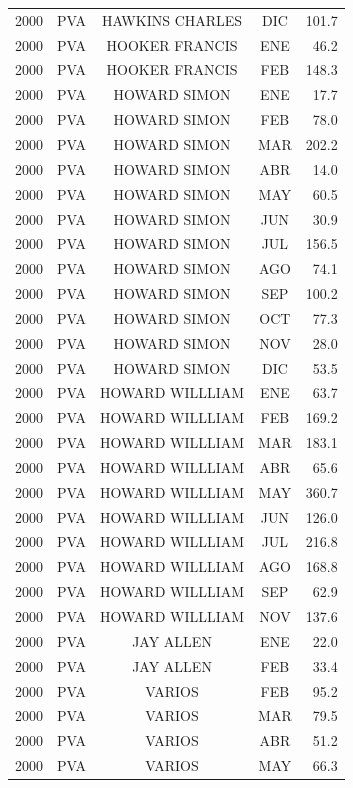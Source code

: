 \documentclass[12pt,]{article}
\begin{document}
\begin{table}[ht]
{\begin{tabular}{lcccr}
  2000 & PVA & HAWKINS CHARLES & DIC & 101.7 \\ 
  2000 & PVA & HOOKER FRANCIS & ENE & 46.2 \\ 
  2000 & PVA & HOOKER FRANCIS & FEB & 148.3 \\ 
  2000 & PVA & HOWARD SIMON & ENE & 17.7 \\ 
  2000 & PVA & HOWARD SIMON & FEB & 78.0 \\ 
  2000 & PVA & HOWARD SIMON & MAR & 202.2 \\ 
  2000 & PVA & HOWARD SIMON & ABR & 14.0 \\ 
  2000 & PVA & HOWARD SIMON & MAY & 60.5 \\ 
  2000 & PVA & HOWARD SIMON & JUN & 30.9 \\ 
  2000 & PVA & HOWARD SIMON & JUL & 156.5 \\ 
  2000 & PVA & HOWARD SIMON & AGO & 74.1 \\ 
  2000 & PVA & HOWARD SIMON & SEP & 100.2 \\ 
  2000 & PVA & HOWARD SIMON & OCT & 77.3 \\ 
  2000 & PVA & HOWARD SIMON & NOV & 28.0 \\ 
  2000 & PVA & HOWARD SIMON & DIC & 53.5 \\ 
  2000 & PVA & HOWARD WILLLIAM & ENE & 63.7 \\ 
  2000 & PVA & HOWARD WILLLIAM & FEB & 169.2 \\ 
  2000 & PVA & HOWARD WILLLIAM & MAR & 183.1 \\ 
  2000 & PVA & HOWARD WILLLIAM & ABR & 65.6 \\ 
  2000 & PVA & HOWARD WILLLIAM & MAY & 360.7 \\ 
  2000 & PVA & HOWARD WILLLIAM & JUN & 126.0 \\ 
  2000 & PVA & HOWARD WILLLIAM & JUL & 216.8 \\ 
  2000 & PVA & HOWARD WILLLIAM & AGO & 168.8 \\ 
  2000 & PVA & HOWARD WILLLIAM & SEP & 62.9 \\ 
  2000 & PVA & HOWARD WILLLIAM & NOV & 137.6 \\ 
  2000 & PVA & JAY ALLEN & ENE & 22.0 \\ 
  2000 & PVA & JAY ALLEN & FEB & 33.4 \\ 
  2000 & PVA & VARIOS & FEB & 95.2 \\ 
  2000 & PVA & VARIOS & MAR & 79.5 \\ 
  2000 & PVA & VARIOS & ABR & 51.2 \\ 
  2000 & PVA & VARIOS & MAY & 66.3 \\ 

\end{tabular}}
\end{table}
\end{document}
